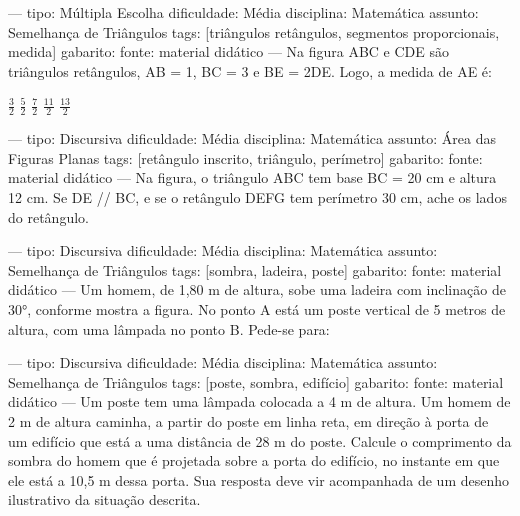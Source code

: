 
---
tipo: Múltipla Escolha
dificuldade: Média
disciplina: Matemática
assunto: Semelhança de Triângulos
tags: [triângulos retângulos, segmentos proporcionais, medida]
gabarito:
fonte: material didático
---
\question
Na figura ABC e CDE são triângulos retângulos, AB = 1, BC = 3 e BE = 2DE. Logo, a medida de AE é:
\begin{choices}
\choice $\frac{3}{2}$
\choice $\frac{5}{2}$
\choice $\frac{7}{2}$
\choice $\frac{11}{2}$
\choice $\frac{13}{2}$
\end{choices}


---
tipo: Discursiva
dificuldade: Média
disciplina: Matemática
assunto: Área das Figuras Planas
tags: [retângulo inscrito, triângulo, perímetro]
gabarito:
fonte: material didático
---
\question
Na figura, o triângulo ABC tem base BC = 20 cm e altura 12 cm. Se DE // BC, e se o retângulo DEFG tem perímetro 30 cm, ache os lados do retângulo.


---
tipo: Discursiva
dificuldade: Média
disciplina: Matemática
assunto: Semelhança de Triângulos
tags: [sombra, ladeira, poste]
gabarito:
fonte: material didático
---
\question
Um homem, de 1,80 m de altura, sobe uma ladeira com inclinação de 30°, conforme mostra a figura. No ponto A está um poste vertical de 5 metros de altura, com uma lâmpada no ponto B. Pede-se para:


---
tipo: Discursiva
dificuldade: Média
disciplina: Matemática
assunto: Semelhança de Triângulos
tags: [poste, sombra, edifício]
gabarito:
fonte: material didático
---
\question
Um poste tem uma lâmpada colocada a 4 m de altura. Um homem de 2 m de altura caminha, a partir do poste em linha reta, em direção à porta de um edifício que está a uma distância de 28 m do poste. Calcule o comprimento da sombra do homem que é projetada sobre a porta do edifício, no instante em que ele está a 10,5 m dessa porta. Sua resposta deve vir acompanhada de um desenho ilustrativo da situação descrita.

